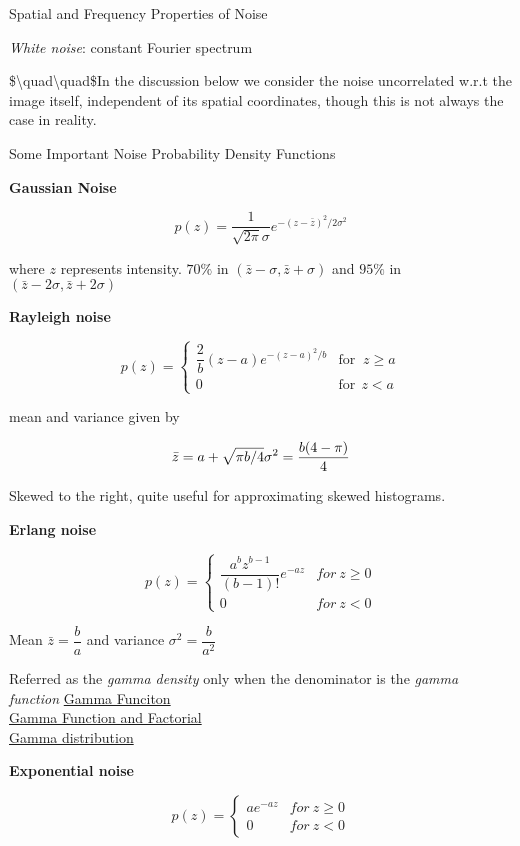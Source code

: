 \documentclass[]{article}
\begin{document}
Spatial and Frequency Properties of Noise

\emph{White noise}: constant Fourier spectrum

\$\textbackslash{}quad\textbackslash{}quad\$In the discussion below we
consider the noise uncorrelated w.r.t the image itself, independent of
its spatial coordinates, though this is not always the case in reality.

Some Important Noise Probability Density Functions

\textbf{Gaussian Noise}

\[p(z)=\dfrac{1}{\sqrt{2 \pi} \sigma}e^{-(z-\bar{z})^2/2\sigma^2}\]

where \(z\) represents intensity. \(70\%\) in
\((\bar{z}-\sigma,\bar{z}+\sigma)\) and \(95\%\) in
\((\bar{z}-2\sigma,\bar{z}+2\sigma)\)

\textbf{Rayleigh noise}

\[p(z)=\begin{cases}\dfrac{2}{b}(z-a)e^{-(z-a)^2/b}&\text{for }\ z\geq a\\0 & \text{for} \ \ z<a\end{cases}\]

mean and variance given by

\[\bar{z}=a+\sqrt{\pi b/4}\\
\sigma^2=\dfrac{b(4-\pi)}{4}\]

Skewed to the right, quite useful for approximating skewed histograms.

\textbf{Erlang noise}

\[p(z)=\begin{cases}\dfrac{a^b z^{b-1}}{(b-1)!}e^{-az}&for\ z\geq 0\\
0&for\ z<0\end{cases}\]

Mean \(\bar{z}=\dfrac{b}{a}\) and variance \(\sigma^2=\dfrac{b}{a^2}\)

Referred as the \emph{gamma density} only when the denominator is the
\emph{gamma function}
\href{https://en.wikipedia.org/wiki/Gamma_function}{Gamma Funciton}\\

\href{https://en.wikipedia.org/wiki/Factorial\#Extension_of_factorial_to_non-integer_values_of_argument}{Gamma
Function and Factorial}\\
 \href{https://en.wikipedia.org/wiki/Gamma_distribution}{Gamma
distribution}

\textbf{Exponential noise}

\[p(z)=\begin{cases}ae^{-az} & for\ z\geq 0\\0 & for\ z<0 \end{cases}\]
\end{document}
